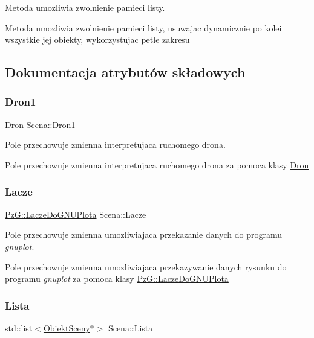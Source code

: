 Metoda umozliwia zwolnienie pamieci listy. 

Metoda umozliwia zwolnienie pamieci listy, usuwajac dynamicznie po kolei wszystkie jej obiekty, wykorzystujac petle zakresu 

\subsection{Dokumentacja atrybutów składowych}
\mbox{\label{classScena_a98ad54358eeb2b6f1ea3c4b1c16c72b4}} 
\subsubsection{\texorpdfstring{Dron1}{Dron1}}
{\footnotesize\ttfamily \hyperlink{classDron}{Dron} Scena\+::\+Dron1\hspace{0.3cm}{\ttfamily [private]}}



Pole przechowuje zmienna interpretujaca ruchomego drona. 

Pole przechowuje zmienna interpretujaca ruchomego drona za pomoca klasy \hyperlink{classDron}{Dron} \mbox{\label{classScena_ae8d7d121ba09af12c456a6dfe6da316b}} 
\subsubsection{\texorpdfstring{Lacze}{Lacze}}
{\footnotesize\ttfamily \hyperlink{classPzG_1_1LaczeDoGNUPlota}{Pz\+G\+::\+Lacze\+Do\+G\+N\+U\+Plota} Scena\+::\+Lacze\hspace{0.3cm}{\ttfamily [private]}}



Pole przechowuje zmienna umozliwiajaca przekazanie danych do programu {\itshape gnuplot}. 

Pole przechowuje zmienna umozliwiajaca przekazywanie danych rysunku do programu {\itshape gnuplot} za pomoca klasy \hyperlink{classPzG_1_1LaczeDoGNUPlota}{Pz\+G\+::\+Lacze\+Do\+G\+N\+U\+Plota} \mbox{\label{classScena_ad892638f354c23efb22296381aedd04f}} 
\subsubsection{\texorpdfstring{Lista}{Lista}}
{\footnotesize\ttfamily std\+::list$<$\hyperlink{classObiektSceny}{Obiekt\+Sceny}$\ast$$>$ Scena\+::\+Lista\hspace{0.3cm}{\ttfamily [private]}}



